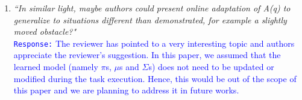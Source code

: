 \documentclass[10pt,stdletter,dateno]{newlfm}
\begin{document}
\begin{newlfm}
\begin{enumerate}
\item \textit{``In similar light, maybe authors could present online adaptation of
A(q) to generalize to situations different than demonstrated, for
example a slightly moved obstacle?"}\\
\textcolor{blue}{\texttt{Response:} \small The reviewer has pointed to a very interesting topic and authors appreciate the reviewer’s suggestion. In this paper, we assumed that the learned model (namely $ \pi $s, $ \mu $s and $ \Sigma $s) does not need to be updated or modified during the task execution. Hence, this would be out of the scope of this paper and we are planning to address it in future works.
}\\


\end{enumerate}
\end{newlfm}
\end{document}
